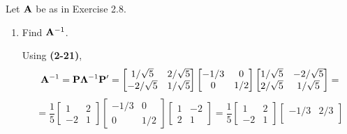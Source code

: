         Let $\bold{A}$ be as in Exercise 2.8.
        \begin{enumerate}[label=(\alph*)]
            \item Find $\bold{A}^{-1}$.
            \par
            Using \textbf{(2-21)}, 
            \[
                \bold{A}^{-1}
                =
                \bold{P}\bold{\Lambda}^{-1}\bold{P}^\prime
                =
                \begin{bmatrix}
                    1/\sqrt{5} & 2/\sqrt{5} \\
                    -2/\sqrt{5} & 1/\sqrt{5}
                \end{bmatrix}
                \begin{bmatrix}
                    -1/3 & 0 \\
                    0 & 1/2
                \end{bmatrix}
                \begin{bmatrix}
                    1/\sqrt{5} & -2/\sqrt{5} \\
                    2/\sqrt{5} & 1/\sqrt{5}
                \end{bmatrix}
                =
            \]
            \[
                =
                \frac{1}{5}
                \begin{bmatrix}
                    1 & 2 \\
                    -2 & 1
                \end{bmatrix}
                \begin{bmatrix}
                    -1/3 & 0 \\
                    0 & 1/2
                \end{bmatrix}
                \begin{bmatrix}
                    1 & -2 \\
                    2 & 1
                \end{bmatrix}
                =
                \frac{1}{5}
                \begin{bmatrix}
                    1 & 2 \\
                    -2 & 1
                \end{bmatrix}
                \begin{bmatrix}
                    -1/3 & 2/3 \\

\end{bmatrix}\]
\end{enumerate}
